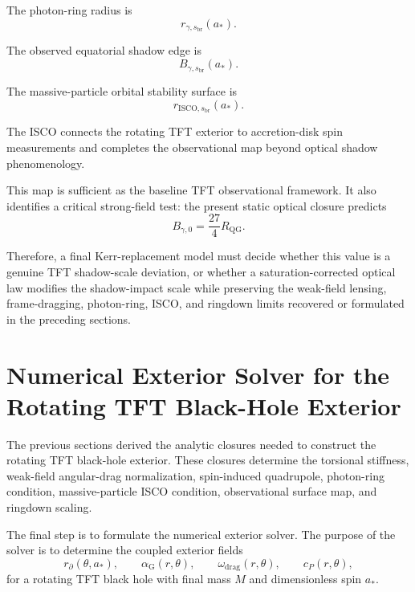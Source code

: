 The photon-ring radius is
\begin{equation}
    r_{\gamma,s_{\mathrm{br}}}(a_\ast).
\end{equation}

The observed equatorial shadow edge is
\begin{equation}
    B_{\gamma,s_{\mathrm{br}}}(a_\ast).
\end{equation}

The massive-particle orbital stability surface is
\begin{equation}
    r_{\mathrm{ISCO},s_{\mathrm{br}}}(a_\ast).
\end{equation}

The ISCO connects the rotating TFT exterior to accretion-disk spin measurements and completes the observational map beyond optical shadow phenomenology.

This map is sufficient as the baseline TFT observational framework. It also identifies a critical strong-field test: the present static optical closure predicts
\begin{equation}
    B_{\gamma,0} = \frac{27}{4}R_{\mathrm{QG}}.
\end{equation}

Therefore, a final Kerr-replacement model must decide whether this value is a genuine TFT shadow-scale deviation, or whether a saturation-corrected optical law modifies the shadow-impact scale while preserving the weak-field lensing, frame-dragging, photon-ring, ISCO, and ringdown limits recovered or formulated in the preceding sections.

\section{Numerical Exterior Solver for the Rotating TFT Black-Hole Exterior}

The previous sections derived the analytic closures needed to construct the rotating TFT black-hole exterior. These closures determine the torsional stiffness, weak-field angular-drag normalization, spin-induced quadrupole, photon-ring condition, massive-particle ISCO condition, observational surface map, and ringdown scaling.

The final step is to formulate the numerical exterior solver. The purpose of the solver is to determine the coupled exterior fields
\begin{equation}
    r_{\partial}(\theta,a_\ast), \qquad \alpha_{\mathrm{G}}(r,\theta), \qquad \omega_{\mathrm{drag}}(r,\theta), \qquad c_P(r,\theta),
\end{equation}
for a rotating TFT black hole with final mass $M$ and dimensionless spin $a_\ast$.

